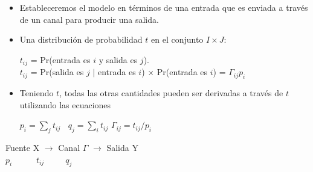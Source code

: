 \documentclass{beamer}
\theoremstyle{plain}
\theoremstyle{example}
\theoremstyle{example}
\begin{document}
\begin{frame} [fragile] \small  
\begin{itemize}  
\item Estableceremos el modelo en términos de una entrada que es enviada a través de un canal para producir una salida.

\item  Una distribución de probabilidad $t$ en el conjunto $I \times J$:

\begin{center}
$t_{ij}$ = Pr(entrada es $i$ y salida es $j$). \\
$t_{ij}$ =  Pr(salida es $j$ $|$ entrada es $i$) $\times$ Pr(entrada es $i$) = $\Gamma_{ij} p_i$
\end{center}

\item Teniendo $t$, todas las otras cantidades pueden ser derivadas a través de $t$ utilizando las ecuaciones

\begin{center}
$p_i=\sum_j t_{ij} \;\;$  $q_j=\sum_i t_{ij}$ \;\; $\Gamma_{ij}=t_{ij}/p_i$
\end{center}

\end{itemize} 
\vspace{0.3cm}
\begin{center}
        Fuente X  $\rightarrow$ Canal $\Gamma$   $\rightarrow$  Salida Y\\
      $p_i$   \,\,\, \,\,\, \,\,\,    $t_{ij}$     \,\,\, \,\,\,\,\,\,  $q_j$    
\end{center}




\end{frame} 
\end{document}
